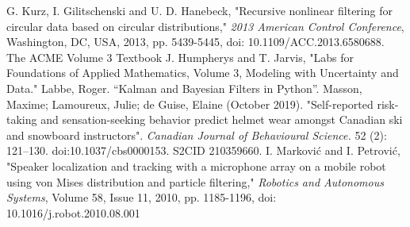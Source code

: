 \documentclass[11pt]{amsart}
\begin{document}
\begin{thebibliography}{99}
 G. Kurz, I. Gilitschenski and U. D. Hanebeck, "Recursive nonlinear filtering for circular data based on circular distributions," \textit{2013 American Control Conference}, Washington, DC, USA, 2013, pp. 5439-5445, doi: 10.1109/ACC.2013.6580688.
 The ACME Volume 3 Textbook
 J. Humpherys and T. Jarvis, "Labs for Foundations of Applied Mathematics, Volume 3, Modeling with Uncertainty and Data."
 Labbe, Roger. “Kalman and Bayesian Filters in Python”.
 Masson, Maxime; Lamoureux, Julie; de Guise, Elaine (October 2019). "Self-reported risk-taking and sensation-seeking behavior predict helmet wear amongst Canadian ski and snowboard instructors". \textit{Canadian Journal of Behavioural Science.} 52 (2): 121–130. doi:10.1037/cbs0000153. S2CID 210359660.
 I. Marković and I. Petrović, "Speaker localization and tracking with a microphone array on a mobile robot using von Mises distribution and particle filtering," \textit{Robotics and Autonomous Systems}, Volume 58, Issue 11, 2010, pp. 1185-1196, doi: 10.1016/j.robot.2010.08.001
\end{thebibliography}
\end{document}
